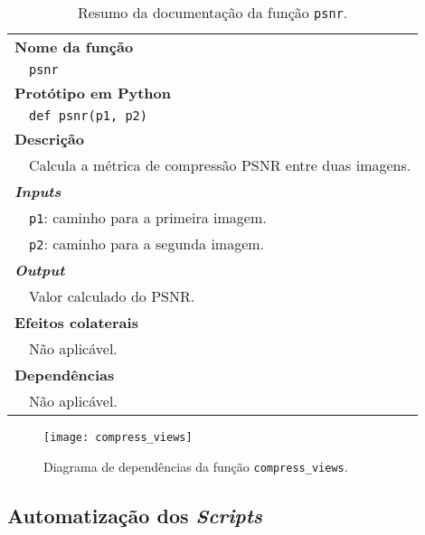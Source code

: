 \begin{table}[!htbp]
    \centering
    \caption{Resumo da documentação da função \texttt{psnr}.}
    \label{tab:psnr}
    \begin{tabular}{p{1cm} p{10cm}}
        \hline
        \multicolumn{2}{l}{\bfseries Nome da função}\\
         & \verb|psnr|\\
        \hline
        \multicolumn{2}{l}{\bfseries Protótipo em Python}\\
         & \texttt{def psnr(p1, p2)} \\
        \hline\multicolumn{2}{l}{\bfseries Descrição}\\
         & Calcula a métrica de compressão \ac{PSNR} entre duas imagens. \\
        \hline\multicolumn{2}{l}{\bfseries \textit{Inputs}}\\
         & \verb|p1|: caminho para a primeira imagem. \\
         & \verb|p2|: caminho para a segunda imagem. \\
        \hline\multicolumn{2}{l}{\bfseries \textit{Output}}\\
         & Valor calculado do \ac{PSNR}. \\
        \hline\multicolumn{2}{l}{\bfseries Efeitos colaterais}\\
         & Não aplicável. \\
        \hline\multicolumn{2}{l}{\bfseries Dependências}\\
         & Não aplicável. \\
        \hline
    \end{tabular}
\end{table}


\begin{figure}[!htbp]
    \centering
    \texttt{[image: compress\_views]}
    \caption{Diagrama de dependências da função \texttt{compress\_views}.}
    \label{fig:compress_views}
\end{figure}



\subsection{Automatização dos \textit{Scripts}}
\label{ssec::imp-test:holo-compress:auto-script}

